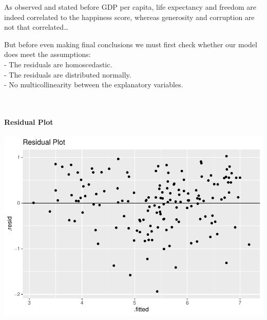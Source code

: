 \documentclass[
]{article}
\newenvironment{Shaded}{\begin{snugshade}}{\end{snugshade}}
\newcommand{\AttributeTok}[1]{\textcolor[rgb]{0.77,0.63,0.00}{#1}}
\newcommand{\DecValTok}[1]{\textcolor[rgb]{0.00,0.00,0.81}{#1}}
\newcommand{\FunctionTok}[1]{\textcolor[rgb]{0.00,0.00,0.00}{#1}}
\newcommand{\NormalTok}[1]{#1}
\newcommand{\OtherTok}[1]{\textcolor[rgb]{0.56,0.35,0.01}{#1}}
\newcommand{\SpecialCharTok}[1]{\textcolor[rgb]{0.00,0.00,0.00}{#1}}
\newcommand{\StringTok}[1]{\textcolor[rgb]{0.31,0.60,0.02}{#1}}
\begin{document}
As observed and stated before GDP per capita, life expectancy and
freedom are indeed correlated to the happiness score, whereas generosity
and corruption are not that correlated\ldots{}

But before even making final conclusions we must first check whether our
model does meet the assumptions:\\
- The residuals are homoscedastic.\\
- The residuals are distributed normally.\\
- No multicollinearity between the explanatory variables.\\
\strut \\

\hypertarget{residual-plot}{%
\paragraph{Residual Plot}\label{residual-plot}}

\begin{Shaded}
\end{Shaded}

\includegraphics{World-Happiness_files/figure-latex/unnamed-chunk-13-1.pdf}\\
\strut \\
\end{document}
